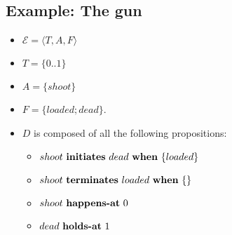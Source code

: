 \subsection{Example: The gun}

\begin{itemize}
  \item $\mathcal{E}=\langle T,A,F\rangle$
  \item $T=\{0..1\}$
  \item $A=\{shoot\}$
  \item $F=\{loaded;dead\}$.
  \item $D$ is composed of all the following propositions:
  \begin{itemize}
    \item $shoot \text{ \textbf{initiates} } dead \text{ \textbf{when} } \{loaded\}$
    \item $shoot \text{ \textbf{terminates} } loaded \text{ \textbf{when} } \{\}$
    \item $shoot \text{ \textbf{happens-at} } 0$
    \item $dead \text{ \textbf{holds-at} } 1$
  \end{itemize}
\end{itemize}
